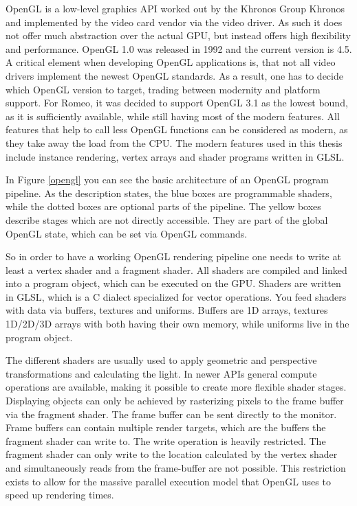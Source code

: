 \ac{OpenGL} is a low-level graphics API worked out by the Khronos Group \ac{Khronos} and implemented by the video card vendor via the video driver. 
As such it does not offer much abstraction over the actual \ac{GPU}, but instead offers high flexibility and performance.
\ac{OpenGL} 1.0 was released in 1992 and the current version is 4.5.
A critical element when developing \ac{OpenGL} applications is, that not all video drivers implement the newest \ac{OpenGL} standards.
As a result, one has to decide which \ac{OpenGL} version to target, trading between modernity and platform support.
For Romeo, it was decided to support \ac{OpenGL} 3.1 as the lowest bound, as it is sufficiently available, while still having most of the modern features.
All features that help to call less OpenGL functions can be considered as modern, as they take away the load from the CPU.
The modern features used in this thesis include instance rendering, vertex arrays and shader programs written in \ac{GLSL}.

In Figure \cref{opengl} you can see the basic architecture of an OpenGL program pipeline.
As the description states, the blue boxes are programmable shaders, while the dotted boxes are optional parts of the pipeline.
The yellow boxes describe stages which are not directly accessible. They are part of the global OpenGL state, which can be set via OpenGL commands.

So in order to have a working OpenGL rendering pipeline one needs to write at least a vertex shader and a fragment shader.
All shaders are compiled and linked into a program object, which can be executed on the \ac{GPU}.
Shaders are written in \ac{GLSL}, which is a C dialect specialized for vector operations.
You feed shaders with data via buffers, textures and uniforms. Buffers are 1D arrays, textures 1D/2D/3D arrays with both having their own memory, while uniforms live in the program object.

The different shaders are usually used to apply geometric and perspective transformations and calculating the light.
In newer APIs general compute operations are available, making it possible to create more flexible shader stages.
Displaying objects can only be achieved by rasterizing pixels to the frame buffer via the fragment shader.
The frame buffer can be sent directly to the monitor.
Frame buffers can contain multiple render targets, which are the buffers the fragment shader can write to.
The write operation is heavily restricted. The fragment shader can only write to the location calculated by the vertex shader and simultaneously reads from the frame-buffer are not possible. 
This restriction exists to allow for the massive parallel execution model that OpenGL uses to speed up rendering times.

